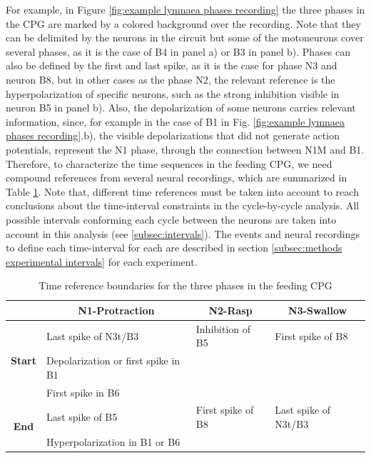 For example, in Figure \ref{fig:example lymnaea phases recording} the three phases in the CPG are marked by a colored background over the recording. Note that they can be delimited by the neurons in the circuit but some of the motoneurons cover several phases, as it is the case of B4 in panel a) or B3 in panel b). Phases can also be defined by the first and last spike, as it is the case for phase N3 and neuron B8, but in other cases as the phase N2, the relevant reference is the hyperpolarization of specific neurons, such as the strong inhibition visible in neuron B5 in panel b). Also, the depolarization of some neurons carries relevant information, since, for example in the case of B1 in Fig. \ref{fig:example lymnaea phases recording}.b), the visible depolarizations that did not generate action potentials, represent the N1 phase, through the connection between N1M and B1. Therefore, to characterize the time sequences in the feeding CPG, we need compound references from several neural recordings, which are summarized in Table \ref{table:cpg ref intervals}. Note that, different time references must be taken into account to reach conclusions about the time-interval constraints in the cycle-by-cycle analysis. All possible intervals conforming each cycle between the neurons are taken into account in this analysis (see \ref{subsec:intervals}). The events and neural recordings to define each time-interval for each are described in section \ref{subsec:methods experimental intervals} for each experiment.


\begin{table}[htb!]
	\centering
	\begin{tabular}{cl|l|l}
			\multicolumn{1}{l}{}                                 & \multicolumn{1}{c|}{\textbf{N1-Protraction}} & \multicolumn{1}{c|}{\textbf{N2-Rasp}} & \multicolumn{1}{c}{\textbf{N3-Swallow}} \\ \hline
			\multicolumn{1}{c|}{\multirow{3}{*}{\textbf{Start}}} & Last spike of N3t/B3                         & Inhibition of B5                      & First spike of B8                       \\
			\multicolumn{1}{c|}{}                                & Depolarization or first spike in B1          &                                       &                                         \\
			\multicolumn{1}{c|}{}                                & First spike in B6                            &                                       &                                         \\ \hline
			\multicolumn{1}{c|}{\multirow{2}{*}{\textbf{End}}}   & Last spike of B5                             & First spike of B8                     & Last spike of N3t/B3                    \\
			\multicolumn{1}{c|}{}                                & Hyperpolarization in B1 or B6                &                                       &                                        
		\end{tabular}
	\caption{Time reference boundaries for the three phases in the feeding CPG}
	\label{table:cpg ref intervals}
\end{table}

